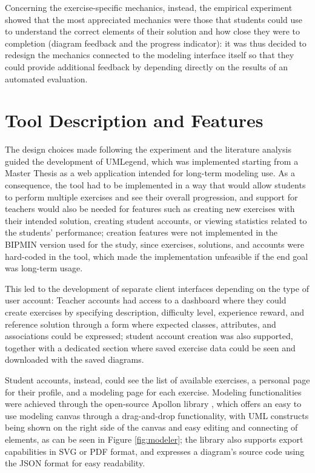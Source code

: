 Concerning the exercise-specific mechanics, instead, the empirical experiment showed that the most appreciated mechanics were those that students could use to understand the correct elements of their solution and how close they were to completion (diagram feedback and the progress indicator): it was thus decided to redesign the mechanics connected to the modeling interface itself so that they could provide additional feedback by depending directly on the results of an automated evaluation.



\section{Tool Description and Features}

The design choices made following the experiment and the literature analysis guided the development of UMLegend, which was implemented starting from a Master Thesis as a web application intended for long-term modeling use. As a consequence, the tool had to be implemented in a way that would allow students to perform multiple exercises and see their overall progression, and support for teachers would also be needed for features such as creating new exercises with their intended solution, creating student accounts, or viewing statistics related to the students' performance; creation features were not implemented in the BIPMIN version used for the study, since exercises, solutions, and accounts were hard-coded in the tool, which made the implementation unfeasible if the end goal was long-term usage. 

This led to the development of separate client interfaces depending on the type of user account: Teacher accounts had access to a dashboard where they could create exercises by specifying description, difficulty level, experience reward, and reference solution through a form where expected classes, attributes, and associations could be expressed; student account creation was also supported, together with a dedicated section where saved exercise data could be seen and downloaded with the saved diagrams.

Student accounts, instead, could see the list of available exercises, a personal page for their profile, and a modeling page for each exercise. Modeling functionalities were achieved through the open-source Apollon library \cite{krusche2020interactive}, which offers an easy to use modeling canvas through a drag-and-drop functionality, with UML constructs being shown on the right side of the canvas and easy editing and connecting of elements, as can be seen in Figure \ref{fig:modeler}; the library also supports export capabilities in SVG or PDF format, and expresses a diagram's source code using the JSON format for easy readability.

